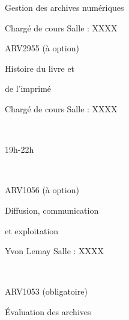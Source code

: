 \documentclass [12 pt]{article}
\begin{document}
                                    Gestion des archives 
                                    numériques
                                
                                Chargé de cours
                                Salle : XXXX
                            
                            
                                
                                    ARV2955 (à option)
                                
                                
                                    Histoire du livre 
                                    et 
                                
                                
                                    de l'imprimé
                                
                                Chargé de cours
                                Salle : XXXX
                            
                            
                                                                      
                            
                        
                        
                            
                                19h-22h
                            
                             
                            
                                
                                    ARV1056 (à
                                        option)
                                
                                
                                    Diffusion, communication
                                
                                
                                    et exploitation
                                
                                Yvon Lemay
                                Salle : XXXX
                            
                             
                            
                                
                                    ARV1053
                                            (obligatoire)
                                
                                
                                    Évaluation des archives
                                
\end{document}
